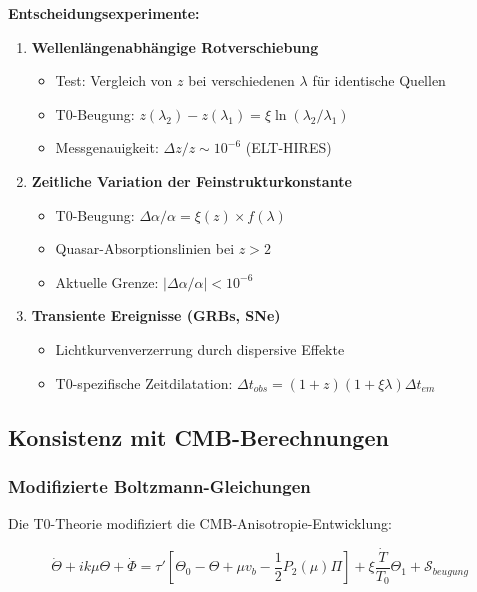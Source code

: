 \documentclass[12pt,a4paper]{article}
\theoremstyle{definition}
\begin{document}
\begin{experiment}
	\textbf{Entscheidungsexperimente:}
	\begin{enumerate}
		\item \textbf{Wellenlängenabhängige Rotverschiebung}
		\begin{itemize}
			\item Test: Vergleich von \(z\) bei verschiedenen \(\lambda\) für identische Quellen
			\item T0-Beugung: \(z(\lambda_2) - z(\lambda_1) = \xi \ln(\lambda_2/\lambda_1)\)
			\item Messgenauigkeit: \(\Delta z/z \sim 10^{-6}\) (ELT-HIRES)
		\end{itemize}
		
		\item \textbf{Zeitliche Variation der Feinstrukturkonstante}
		\begin{itemize}
			\item T0-Beugung: \(\Delta\alpha/\alpha = \xi(z) \times f(\lambda)\)
			\item Quasar-Absorptionslinien bei \(z > 2\)
			\item Aktuelle Grenze: \(|\Delta\alpha/\alpha| < 10^{-6}\)
		\end{itemize}
		
		\item \textbf{Transiente Ereignisse (GRBs, SNe)}
		\begin{itemize}
			\item Lichtkurvenverzerrung durch dispersive Effekte
			\item T0-spezifische Zeitdilatation: \(\Delta t_{obs} = (1+z)(1+\xi\lambda)\Delta t_{em}\)
		\end{itemize}
	\end{enumerate}
\end{experiment}

\subsection{Konsistenz mit CMB-Berechnungen}
\label{subsec:cmb_consistency}

\subsubsection{Modifizierte Boltzmann-Gleichungen}

Die T0-Theorie modifiziert die CMB-Anisotropie-Entwicklung:

\begin{equation}
	\dot{\Theta} + ik\mu\Theta + \dot{\Phi} = \tau'[\Theta_0 - \Theta + \mu v_b - \frac{1}{2}P_2(\mu)\Pi] + \xi\frac{\dot{T}}{T_0}\Theta_1 + \mathcal{S}_{beugung}
\end{equation}
\end{document}
